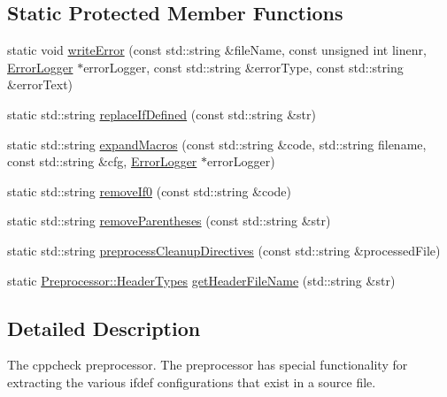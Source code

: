 \subsection*{Static Protected Member Functions}
\begin{DoxyCompactItemize}
\item 
static void \hyperlink{class_preprocessor_a777ed29389812da697989db64d659a66}{write\-Error} (const std\-::string \&file\-Name, const unsigned int linenr, \hyperlink{class_error_logger}{Error\-Logger} $\ast$error\-Logger, const std\-::string \&error\-Type, const std\-::string \&error\-Text)
\item 
static std\-::string \hyperlink{class_preprocessor_abdc95c14f17851503c3124671abb9f24}{replace\-If\-Defined} (const std\-::string \&str)
\item 
static std\-::string \hyperlink{class_preprocessor_acc39c1fc0b6243e66d6a4e8612225130}{expand\-Macros} (const std\-::string \&code, std\-::string filename, const std\-::string \&cfg, \hyperlink{class_error_logger}{Error\-Logger} $\ast$error\-Logger)
\item 
static std\-::string \hyperlink{class_preprocessor_adff1ceebe9b262fabef85f73350b1508}{remove\-If0} (const std\-::string \&code)
\item 
static std\-::string \hyperlink{class_preprocessor_a1f185becfb19d2cec8de58569f71d78f}{remove\-Parentheses} (const std\-::string \&str)
\item 
static std\-::string \hyperlink{class_preprocessor_a0c67a74e8c8baa0a9fcb6523f1200e02}{preprocess\-Cleanup\-Directives} (const std\-::string \&processed\-File)
\item 
static \hyperlink{class_preprocessor_a520e91d9d06d928a7377385fe9414d11}{Preprocessor\-::\-Header\-Types} \hyperlink{class_preprocessor_aa04edc3c2763c9b0a0104eba0a9ac3f2}{get\-Header\-File\-Name} (std\-::string \&str)
\end{DoxyCompactItemize}


\subsection{Detailed Description}
The cppcheck preprocessor. The preprocessor has special functionality for extracting the various ifdef configurations that exist in a source file. 

